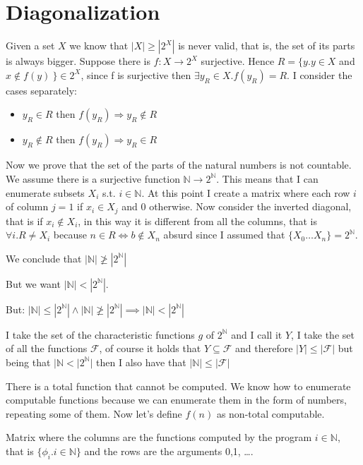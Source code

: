 \documentclass{amsbook}
\newcommand{\nat}{\ensuremath{\mathbb{N}}}
\theoremstyle{definition}
\theoremstyle{remark}
\numberwithin{section}{chapter}
\numberwithin{equation}{chapter}
\begin{document}
\chapter{Diagonalization}

Given a set $X$ we know that $ |X| \geq |2^X| $ is never valid, that is, the set of its parts is always bigger. Suppose there is $ f:X\rightarrow2^X $ surjective. Hence $ R = \{y . y \in X $ and $ x \not \in f(y) \ \} \in 2^X $, since f is surjective then $ \exists y_R \in X . f(y_R)  = R$. I consider the cases separately:
\begin{itemize}
	\item $ y_R \in R $ then $f(y_R) \Rightarrow y_R \not \in R $
	\item $ y_R \not \in R $ then $ f(y_R) \Rightarrow y_R \in R$
\end{itemize}
Now we prove that the set of the parts of the natural numbers is not countable. We assume there is a surjective function $ \nat \rightarrow 2^\nat $. This means that I can enumerate subsets $ X_i $ s.t. $ i \in \nat $. At this point I create a matrix where each row $i$ of column $j = 1$ if $ x_i \in X_j $ and 0 otherwise. Now consider the inverted diagonal, that is if $ x_i \not \in X_i $, in this way it is different from all the columns, that is $ \forall i . R \not= X_i $ because $ n \in R \Leftrightarrow b \not \in X_n $ absurd since I assumed that $ \{X_0 \dots X_n \} = 2^\nat$.

We conclude that $ |\nat| \not \geq |2^\nat| $

But we want $ |\nat| < |2^\nat| $.

But: $ |\nat| \leq |2^\nat| \land |\nat| \not\geq |2^\nat| \implies |\nat| < |2^\nat| $

I take the set of the characteristic functions $g$ of $ 2^\nat $ and I call it $Y$, I take the set of all the functions $ \mathcal{F} $, of course it holds that $ Y \subseteq \mathcal{F} $ and therefore $ |Y| \leq |\mathcal{F}| $ but being that $ |\nat < |2^\nat| $ then I also have that $ |\nat| \leq |\mathcal{F}| $

There is a total function that cannot be computed. We know how to enumerate computable functions because we can enumerate them in the form of numbers, repeating some of them. Now let's define $ f(n) $ as non-total computable.

Matrix where the columns are the functions computed by the program $ i \in \nat $, that is $ \{\phi_i . i \in \nat \} $ and the rows are the arguments 0,1, \dots.
\end{document}
